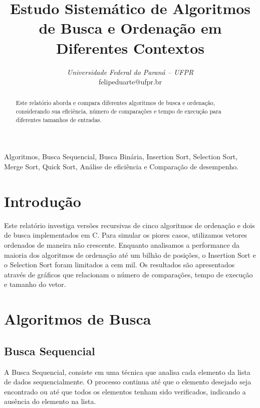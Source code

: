 \documentclass[conference]{IEEEtran}
\begin{document}
\title{Estudo Sistemático de Algoritmos de Busca e Ordenação em Diferentes Contextos}

\author{
\textit{Universidade Federal do Paraná -- UFPR}\\
felipeduarte@ufpr.br}

\maketitle

\begin{abstract}
Este relatório aborda e compara diferentes algoritmos de busca e ordenação, considerando sua eficiência, número de comparações e tempo de execução para diferentes tamanhos de entradas.
\end{abstract}

\begin{IEEEkeywords}
Algoritmos, Busca Sequencial, Busca Binária, Insertion Sort, Selection Sort, Merge Sort, Quick Sort, Análise de eficiência e Comparação de desempenho.
\end{IEEEkeywords}

\section{Introdução}
Este relatório investiga versões recursivas de cinco algoritmos de ordenação e dois de busca implementados em C. Para simular os piores casos, utilizamos vetores ordenados de maneira não crescente. Enquanto analisamos a performance da maioria dos algoritmos de ordenação até um bilhão de posições, o Insertion Sort e o Selection Sort foram limitados a cem mil. Os resultados são apresentados através de gráficos que relacionam o número de comparações, tempo de execução e tamanho do vetor.

\section{Algoritmos de Busca}
\subsection{Busca Sequencial}
A Busca Sequencial, consiste em uma técnica que analisa cada elemento da lista de dados sequencialmente. O processo continua até que o elemento desejado seja encontrado ou até que todos os elementos tenham sido verificados, indicando a ausência do elemento na lista.
\end{document}
